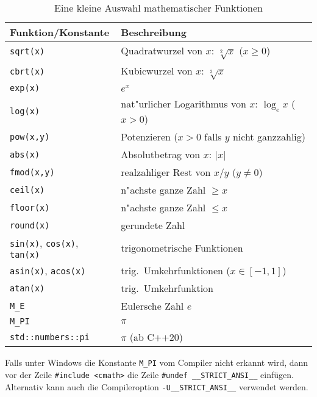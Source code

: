 \begin{table}[htb]
\begin{tabular} {l@{\quad}p{}}
 Funktion/Konstante & Beschreibung \\ \hline
 \verb|sqrt(x)|  & Quadratwurzel von $x$: $\sqrt[2]{x}$ ($x\ge0$)  \\
 \verb|cbrt(x)|  & Kubicwurzel von $x$: $\sqrt[3]{x}$  \\
 \verb|exp(x)|   & $e^x$  \\
 \verb|log(x)|   & nat"urlicher Logarithmus von $x$: $\log_{e} x$ ($x>0$) \\
 \verb|pow(x,y)| & Potenzieren ($x>0$ falls $y$ nicht ganzzahlig)\\
 \verb|abs(x)|  & Absolutbetrag von $x$: $|x|$ \\
 \verb|fmod(x,y)|  & realzahliger Rest von $x/y$ ($y \neq 0$)\\
 \verb|ceil(x)|  & n"achste ganze Zahl $\ge x$\\
 \verb|floor(x)| & n"achste ganze Zahl $\le x$\\
 \verb|round(x)| & gerundete Zahl\\
 \verb|sin(x)|, \verb|cos(x)|, \verb|tan(x)|
                 & trigonometrische Funktionen \\
 \verb|asin(x)|, \verb|acos(x)| & trig.\   Umkehrfunktionen ($x \in [-1,1]$)\\
 \verb|atan(x)|  & trig.\   Umkehrfunktion \\ \hline
 \verb|M_E|      & Eulersche Zahl $e$ \\
 \verb|M_PI|     & $\pi${} \\
 \verb|std::numbers::pi|   & $\pi${} \quad (ab C++20)
\end{tabular}\label{tab:math}
 \caption{Eine kleine Auswahl mathematischer Funktionen\label{tab:mathfunc}}
\end{table}
Falls unter Windows die Konstante \verb|M_PI| vom  Compiler nicht erkannt wird, dann vor der Zeile \verb|#include <cmath>| die Zeile 
\verb|#undef __STRICT_ANSI__| einfügen. Alternativ kann auch die Compileroption 
\verb|-U__STRICT_ANSI__| verwendet werden.

